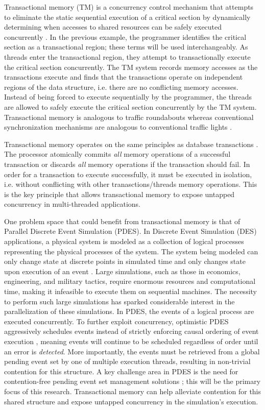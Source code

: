 \documentclass[11pt]{book}
\begin{document}
Transactional memory (TM) is a concurrency control mechanism that attempts to eliminate
the static sequential execution of a critical section by dynamically determining when
accesses to shared resources can be safely executed concurrently \cite{sle_rajwar}.  In
the previous example, the programmer identifies the critical section as a transactional
region; these terms will be used interchangeably.  As threads enter the transactional
region, they attempt to transactionally execute the critical section concurrently.  The TM
system records memory accesses as the transactions execute and finds that the transactions
operate on independent regions of the data structure, i.e. there are no conflicting memory
accesses.  Instead of being forced to execute sequentially by the programmer, the threads
are allowed to safely execute the critical section concurrently by the TM system.
Transactional memory is analogous to traffic roundabouts whereas conventional
synchronization mechanisms are analogous to conventional traffic lights
\cite{neuling_vid}.

Transactional memory operates on the same principles as database transactions
\cite{tm_2nd}.  The processor atomically commits \textit{all} memory operations of a
successful transaction or discards \textit{all} memory operations if the transaction
should fail.  In order for a transaction to execute successfully, it must be executed in
isolation, i.e. without conflicting with other tranasctions/threads memory operations.
This is the key principle that allows transactional memory to expose untapped concurrency
in multi-threaded applications.

One problem space that could benefit from transactional memory is that of Parallel
Discrete Event Simulation (PDES).  In Discrete Event Simulation (DES) applications, a
physical system is modeled as a collection of logical processes representing the physical
processes of the system.  The system being modeled can only change state at discrete
points in simulated time and only changes state upon execution of an event
\cite{fujimoto}.  Large simulations, such as those in economics, engineering, and military
tactics, require enormous resources and computational time, making it infeasible to
execute them on sequential machines.  The necessity to perform such large simulations has
sparked considerable interest in the parallelization of these simulations.  In PDES, the
events of a logical process are executed concurrently.  To further exploit concurrency,
optimistic PDES aggressively schedules events instead of strictly enforcing causal
ordering of event execution \cite{fujimoto,dickman_thesis}, meaning events will continue
to be scheduled regardless of order until an error is \textit{detected}.  More
importantly, the events must be retrieved from a global pending event set by one of
multiple execution threads, resulting in non-trivial contention for this structure.  A key
challenge area in PDES is the need for contention-free pending event set management
solutions \cite{dickman}; this will be the primary focus of this research. Transactional
memory can help alleviate contention for this shared structure and expose untapped
concurrency in the simulation's execution.
\end{document}
